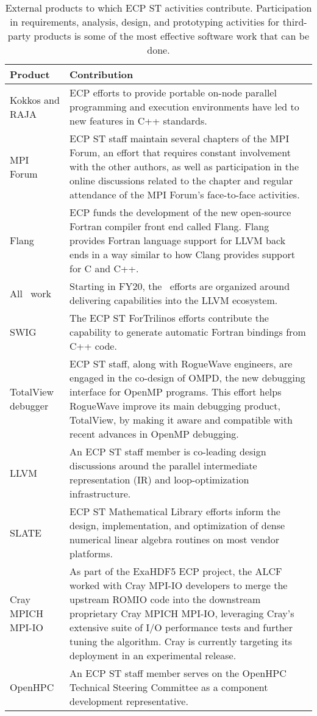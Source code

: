 \begin{table}
	\begin{tabularx}{\textwidth}{|l|X|}\hline
			\rowcolor{LightCyan}
			\textbf{Product} & \textbf{Contribution}\\\hline
			Kokkos and RAJA & ECP efforts to provide portable on-node parallel programming and execution environments have led to new features in C++ standards. \\\hline
			MPI Forum & ECP ST staff maintain several chapters of the MPI Forum, an effort that requires constant involvement with the other authors, as well as participation in the online discussions related to the chapter and regular attendance of the MPI Forum's face-to-face activities.\\\hline
			Flang & ECP funds the development of the new open-source Fortran compiler front end called Flang. Flang provides Fortran language support for LLVM back ends in a way similar to how Clang provides support for C and C++.\\\hline 
			All \tools\ work & Starting in FY20, the \tools\ efforts are organized around delivering capabilities into the LLVM ecosystem.  \\\hline
			SWIG & The ECP ST ForTrilinos efforts contribute the capability to generate automatic Fortran bindings from C++ code.\\\hline
			TotalView debugger & ECP ST staff, along with RogueWave engineers, are engaged in the co-design of OMPD, the new debugging interface for OpenMP programs. This effort helps RogueWave improve its main debugging product, TotalView, by making it aware and compatible with recent advances in OpenMP debugging.\\\hline
			LLVM &  An ECP ST staff member is co-leading design discussions around the parallel intermediate representation (IR) and loop-optimization infrastructure.\\\hline
			SLATE & ECP ST Mathematical Library efforts inform the design, implementation, and optimization of dense numerical linear algebra routines on most vendor platforms.\\\hline
			Cray MPICH MPI-IO & As part of the ExaHDF5 ECP project, the ALCF worked with Cray MPI-IO developers to merge the upstream ROMIO code into the downstream proprietary Cray MPICH MPI-IO, leveraging Cray’s extensive suite of I/O performance tests and further tuning the algorithm.  Cray is currently targeting its deployment in an experimental release.\\\hline
			OpenHPC & An ECP ST staff member serves on the OpenHPC Technical Steering Committee as a component development representative.\\\hline
		\end{tabularx}
		\centering
		\caption{\label{table:externalproducts} External products to which ECP ST activities contribute.  Participation in requirements, analysis, design, and prototyping activities for third-party products is some of the most effective software work that can be done.}
	\end{table}
